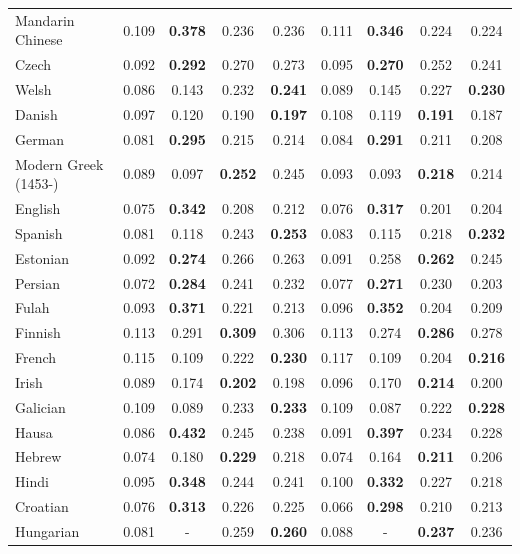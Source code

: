 \begin{longtable}{lcccccccc}
Mandarin Chinese & 0.109 & \textbf{0.378} & 0.236 & 0.236 & 0.111 & \textbf{0.346} & 0.224 & 0.224 \\
Czech & 0.092 & \textbf{0.292} & 0.270 & 0.273 & 0.095 & \textbf{0.270} & 0.252 & 0.241 \\
Welsh & 0.086 & 0.143 & 0.232 & \textbf{0.241} & 0.089 & 0.145 & 0.227 & \textbf{0.230} \\
Danish & 0.097 & 0.120 & 0.190 & \textbf{0.197} & 0.108 & 0.119 & \textbf{0.191} & 0.187 \\
German & 0.081 & \textbf{0.295} & 0.215 & 0.214 & 0.084 & \textbf{0.291} & 0.211 & 0.208 \\
Modern Greek (1453-) & 0.089 & 0.097 & \textbf{0.252} & 0.245 & 0.093 & 0.093 & \textbf{0.218} & 0.214 \\
English & 0.075 & \textbf{0.342} & 0.208 & 0.212 & 0.076 & \textbf{0.317} & 0.201 & 0.204 \\
Spanish & 0.081 & 0.118 & 0.243 & \textbf{0.253} & 0.083 & 0.115 & 0.218 & \textbf{0.232} \\
Estonian & 0.092 & \textbf{0.274} & 0.266 & 0.263 & 0.091 & 0.258 & \textbf{0.262} & 0.245 \\
Persian & 0.072 & \textbf{0.284} & 0.241 & 0.232 & 0.077 & \textbf{0.271} & 0.230 & 0.203 \\
Fulah & 0.093 & \textbf{0.371} & 0.221 & 0.213 & 0.096 & \textbf{0.352} & 0.204 & 0.209 \\
Finnish & 0.113 & 0.291 & \textbf{0.309} & 0.306 & 0.113 & 0.274 & \textbf{0.286} & 0.278 \\
French & 0.115 & 0.109 & 0.222 & \textbf{0.230} & 0.117 & 0.109 & 0.204 & \textbf{0.216} \\
Irish & 0.089 & 0.174 & \textbf{0.202} & 0.198 & 0.096 & 0.170 & \textbf{0.214} & 0.200 \\
Galician & 0.109 & 0.089 & 0.233 & \textbf{0.233} & 0.109 & 0.087 & 0.222 & \textbf{0.228} \\
Hausa & 0.086 & \textbf{0.432} & 0.245 & 0.238 & 0.091 & \textbf{0.397} & 0.234 & 0.228 \\
Hebrew & 0.074 & 0.180 & \textbf{0.229} & 0.218 & 0.074 & 0.164 & \textbf{0.211} & 0.206 \\
Hindi & 0.095 & \textbf{0.348} & 0.244 & 0.241 & 0.100 & \textbf{0.332} & 0.227 & 0.218 \\
Croatian & 0.076 & \textbf{0.313} & 0.226 & 0.225 & 0.066 & \textbf{0.298} & 0.210 & 0.213 \\
Hungarian & 0.081 & - & 0.259 & \textbf{0.260} & 0.088 & - & \textbf{0.237} & 0.236 \\

\end{longtable}
